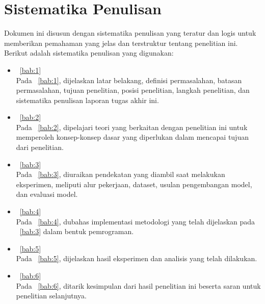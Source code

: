 \section{Sistematika Penulisan}
\label{subbab:1:Sistematika Penulisan}
Dokumen ini disusun dengan sistematika penulisan yang teratur dan logis untuk memberikan pemahaman yang jelas dan terstruktur tentang penelitian ini. Berikut adalah sistematika penulisan yang digunakan:
\begin{itemize}
    \item \bab{}~\ref{bab:1}~\babSatu \\
    Pada \bab{}~\ref{bab:1}, dijelaskan latar belakang, definisi permasalahan, batasan permasalahan, tujuan penelitian, posisi penelitian, langkah penelitian, dan sistematika penulisan laporan tugas akhir ini.
    
    \item \bab{}~\ref{bab:2}~\babDua \\
    Pada \bab{}~\ref{bab:2}, dipelajari teori yang berkaitan dengan penelitian ini untuk memperoleh konsep-konsep dasar yang diperlukan dalam mencapai tujuan dari penelitian.
    
    \item \bab{}~\ref{bab:3}~\babTiga \\
    Pada \bab{}~\ref{bab:3}, diuraikan pendekatan yang diambil saat melakukan eksperimen, meliputi alur pekerjaan, dataset, usulan pengembangan model, dan evaluasi model.
    
    \item \bab{}~\ref{bab:4}~\babEmpat \\
    Pada \bab{}~\ref{bab:4}, dubahas implementasi metodologi yang telah dijelaskan pada \bab{}~\ref{bab:3} dalam bentuk pemrograman.

    \item \bab{}~\ref{bab:5}~\babLima \\
    Pada \bab{}~\ref{bab:5}, dijelaskan hasil eksperimen dan analisis yang telah dilakukan.

    \item \bab{}~\ref{bab:6}~\babEnam \\
    Pada \bab{}~\ref{bab:6}, ditarik kesimpulan dari hasil penelitian ini beserta saran untuk penelitian selanjutnya.
\end{itemize}
